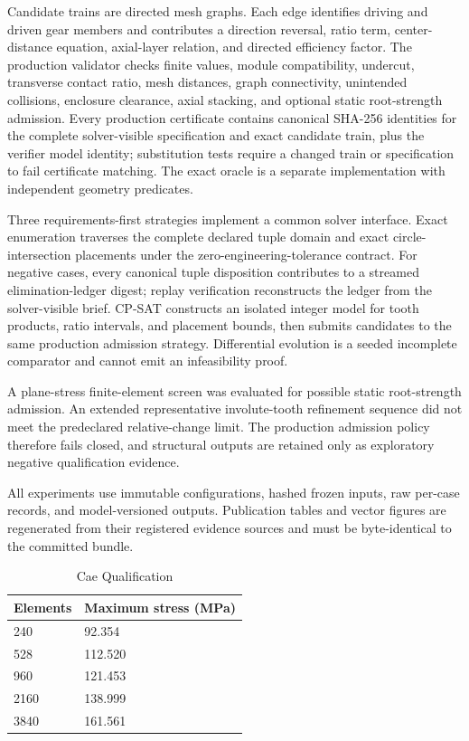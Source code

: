\documentclass[preprint,12pt]{elsarticle}
\begin{document}
Candidate trains are directed mesh graphs. Each edge identifies driving and driven gear members and contributes a direction reversal, ratio term, center-distance equation, axial-layer relation, and directed efficiency factor. The production validator checks finite values, module compatibility, undercut, transverse contact ratio, mesh distances, graph connectivity, unintended collisions, enclosure clearance, axial stacking, and optional static root-strength admission. Every production certificate contains canonical SHA-256 identities for the complete solver-visible specification and exact candidate train, plus the verifier model identity; substitution tests require a changed train or specification to fail certificate matching. The exact oracle is a separate implementation with independent geometry predicates.

Three requirements-first strategies implement a common solver interface. Exact enumeration traverses the complete declared tuple domain and exact circle-intersection placements under the zero-engineering-tolerance contract. For negative cases, every canonical tuple disposition contributes to a streamed elimination-ledger digest; replay verification reconstructs the ledger from the solver-visible brief. CP-SAT constructs an isolated integer model for tooth products, ratio intervals, and placement bounds, then submits candidates to the same production admission strategy. Differential evolution is a seeded incomplete comparator and cannot emit an infeasibility proof.

A plane-stress finite-element screen was evaluated for possible static root-strength admission. An extended representative involute-tooth refinement sequence did not meet the predeclared relative-change limit. The production admission policy therefore fails closed, and structural outputs are retained only as exploratory negative qualification evidence.

All experiments use immutable configurations, hashed frozen inputs, raw per-case records, and model-versioned outputs. Publication tables and vector figures are regenerated from their registered evidence sources and must be byte-identical to the committed bundle.

\begin{table}[htbp]
\centering
\caption{Cae Qualification}
\small
\begin{tabular}{ll}
\textbf{Elements} & \textbf{Maximum stress (MPa)} \\
\hline
240 & 92.354 \\
528 & 112.520 \\
960 & 121.453 \\
2160 & 138.999 \\
3840 & 161.561 \\
\end{tabular}
\end{table}
\end{document}
